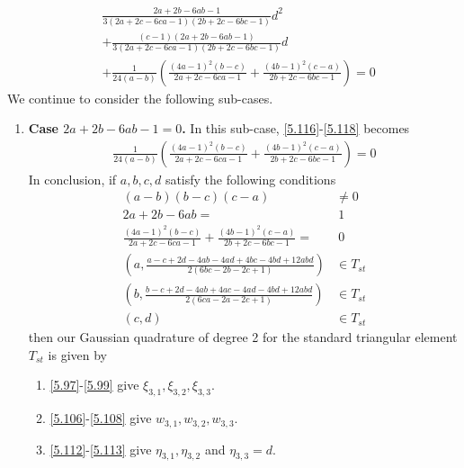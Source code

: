 \documentclass[a4paper]{article}
\numberwithin{equation}{section}
\begin{document}
\begin{enumerate}
\begin{align}
\label{5.116}
&\frac{{2a + 2b - 6ab - 1}}{{3\left( {2a + 2c - 6ca - 1} \right)\left( {2b + 2c - 6bc - 1} \right)}}{d^2}\\
& + \frac{{\left( {c - 1} \right)\left( {2a + 2b - 6ab - 1} \right)}}{{3\left( {2a + 2c - 6ca - 1} \right)\left( {2b + 2c - 6bc - 1} \right)}}d\\
& + \frac{1}{{24\left( {a - b} \right)}}\left( {\frac{{{{\left( {4a - 1} \right)}^2}\left( {b - c} \right)}}{{2a + 2c - 6ca - 1}} + \frac{{{{\left( {4b - 1} \right)}^2}\left( {c - a} \right)}}{{2b + 2c - 6bc - 1}}} \right) =0 \label{5.118}
\end{align}
We continue to consider the following sub-cases.
\begin{enumerate}
\item \textbf{Case $2a + 2b - 6ab - 1=0$.} In this sub-case, \eqref{5.116}-\eqref{5.118} becomes
\begin{align}
\frac{1}{{24\left( {a - b} \right)}}\left( {\frac{{{{\left( {4a - 1} \right)}^2}\left( {b - c} \right)}}{{2a + 2c - 6ca - 1}} + \frac{{{{\left( {4b - 1} \right)}^2}\left( {c - a} \right)}}{{2b + 2c - 6bc - 1}}} \right) = 0
\end{align}
In conclusion, if $a,b,c,d$ satisfy the following conditions
\begin{align}
\left( {a - b} \right)\left( {b - c} \right)\left( {c - a} \right) &\ne 0\\
2a + 2b - 6ab =&\ 1\\
\frac{{{{\left( {4a - 1} \right)}^2}\left( {b - c} \right)}}{{2a + 2c - 6ca - 1}} + \frac{{{{\left( {4b - 1} \right)}^2}\left( {c - a} \right)}}{{2b + 2c - 6bc - 1}} =&\ 0\\
\left( {a,\frac{{a - c + 2d - 4ab - 4ad + 4bc - 4bd + 12abd}}{{2\left( {6bc - 2b - 2c + 1} \right)}}} \right) &\in {T_{st}}\\
\left( {b,\frac{{b - c + 2d - 4ab + 4ac - 4ad - 4bd + 12abd}}{{2\left( {6ca - 2a - 2c + 1} \right)}}} \right) &\in {T_{st}}\\
 \left( {c,d} \right) &\in {T_{st}}
\end{align}
then our Gaussian quadrature of degree 2 for the  standard triangular element $T_{st}$ is given by
\begin{enumerate}
\item\eqref{5.97}-\eqref{5.99} give $\xi _{3,1},\xi _{3,2},\xi _{3,3}$.
\item \eqref{5.106}-\eqref{5.108} give $w_{3,1},w_{3,2},w_{3,3}$.
\item \eqref{5.112}-\eqref{5.113} give $\eta _{3,1},\eta _{3,2}$ and $\eta _{3,3}=d$.

\end{enumerate}
\end{enumerate}
\end{enumerate}
\end{document}
